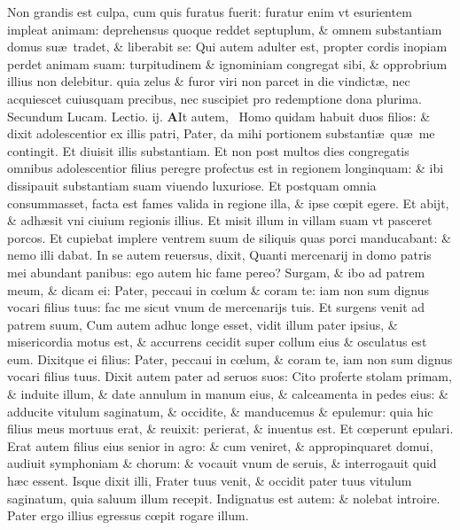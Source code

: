 \documentclass[a5paper,10pt]{book}
\def\rightmarginnote{%
	\lrmarginnote{\hskip\columnwidth \hskip -1em}}
\def\ae{æ}
\def\oe{œ}
\begin{document}
\begin{multicols*}{2}
Non grandis est culpa, cum quis furatus fuerit: furatur enim vt esurientem impleat animam: deprehensus quoque reddet septuplum, \& omnem substantiam domus su\ae \ tradet, \& liberabit se: Qui autem adulter est, propter cordis inopiam perdet animam suam: turpitudinem \& ignominiam congregat sibi, \& opprobrium illius non delebitur. quia zelus \& furor viri non parcet in die vindict\ae , nec acquiescet cuiusquam precibus, nec suscipiet pro redemptione dona plurima.
\newline \color{red} Secundum Lucam. \hfill Lectio. ij. \color{black}
\vspace{-.25em}
\lettrine[lines=2]{\bfseries \color{red} A}{}It\rightmarginnote{c. 15.\\c} autem, \textdagger \ Homo quidam habuit duos filios: \& dixit adolescentior ex illis patri, Pater, da mihi portionem substanti\ae \ qu\ae \ me contingit.
Et diuisit illis substantiam. Et non post multos dies congregatis omnibus adolescentior filius peregre profectus est in regionem longinquam: \& ibi dissipauit substantiam suam viuendo luxuriose.
Et postquam omnia consummasset, facta est fames valida in regione illa, \& ipse c\oe pit egere.
Et abijt, \& adh\ae sit vni ciuium regionis illius. Et misit illum in villam suam vt pasceret porcos.
Et cupiebat implere ventrem suum de siliquis quas porci manducabant: \& nemo illi dabat.
In se autem reuersus, dixit, Quanti mercenarij in domo patris mei abundant panibus: ego autem hic fame pereo?
Surgam, \& ibo ad patrem meum, \& dicam ei: Pater, peccaui in c\oe lum \& coram te: iam non sum dignus vocari filius tuus: fac me sicut vnum de mercenarijs tuis.
Et surgens venit ad patrem suum, Cum autem adhuc longe esset, vidit illum pater ipsius, \& misericordia motus est, \& accurrens cecidit super collum eius \& osculatus est eum.
Dixitque ei filius: Pater, peccaui in c\oe lum, \& coram te, iam non sum dignus vocari filius tuus.
Dixit autem pater ad seruos suos: Cito proferte stolam
primam, \& induite illum, \& date annulum in manum eius, \& calceamenta in pedes eius: \& adducite vitulum saginatum, \& occidite, \& manducemus \& epulemur: quia hic filius meus mortuus erat, \& reuixit: perierat, \& inuentus est.
Et c\oe perunt epulari. Erat autem filius eius senior in agro: \& cum veniret, \& appropinquaret domui, audiuit symphoniam \& chorum: \& vocauit vnum de seruis, \& interrogauit quid h\ae c essent.
Isque dixit illi, Frater tuus venit, \& occidit pater tuus vitulum saginatum, quia saluum illum recepit.
Indignatus est autem: \& nolebat introire. Pater ergo illius egressus c\oe pit rogare illum.

\end{multicols*}
\end{document}
